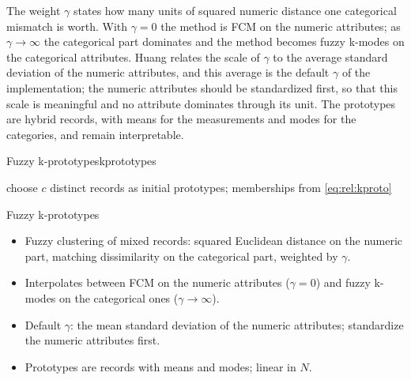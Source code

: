 The weight $\gamma$ states how many units of squared numeric distance one categorical mismatch is worth. With $\gamma=0$ the method is FCM on the numeric attributes; as $\gamma\to\infty$ the categorical part dominates and the method becomes fuzzy k-modes on the categorical attributes. Huang relates the scale of $\gamma$ to the average standard deviation of the numeric attributes, and this average is the default $\gamma$ of the implementation; the numeric attributes should be standardized first, so that this scale is meaningful and no attribute dominates through its unit. The prototypes are hybrid records, with means for the measurements and modes for the categories, and remain interpretable.

\begin{algobox}{Fuzzy k-prototypes}{kprototypes}
\begin{algorithm}[H]
choose $c$ distinct records as initial prototypes; memberships from \eqref{eq:rel:kproto}\;
\end{algorithm}
\end{algobox}
\begin{summarybox}{Fuzzy k-prototypes}
\begin{itemize}
  \item Fuzzy clustering of mixed records: squared Euclidean distance on the numeric part, matching dissimilarity on the categorical part, weighted by $\gamma$.
  \item Interpolates between FCM on the numeric attributes ($\gamma=0$) and fuzzy k-modes on the categorical ones ($\gamma\to\infty$).
  \item Default $\gamma$: the mean standard deviation of the numeric attributes; standardize the numeric attributes first.
  \item Prototypes are records with means and modes; linear in $N$.
\end{itemize}
\end{summarybox}

